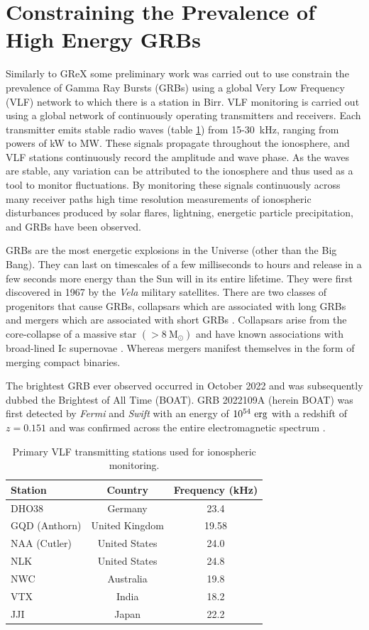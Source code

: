 \section{Constraining the Prevalence of High Energy GRBs}

Similarly to GReX some preliminary work was carried out to use constrain the prevalence of Gamma Ray Bursts (GRBs) using a global Very Low Frequency (VLF) network to which there is a station in Birr. VLF monitoring is carried out using a global network of continuously operating transmitters and receivers. Each transmitter emits stable radio waves  (table \ref{tab:VLFstations}) from 15-30~kHz, ranging from powers of kW to MW. These signals propagate throughout the ionosphere, and VLF stations continuously record the amplitude and wave phase. As the waves are stable, any variation can be attributed to the ionosphere and thus used as a tool to monitor fluctuations. By monitoring these signals continuously across many receiver paths high time resolution measurements of ionospheric disturbances produced by solar flares, lightning, energetic particle precipitation, and GRBs have been observed. 

GRBs are the most energetic explosions in the Universe (other than the Big Bang). They can last on timescales of a few milliseconds to hours and release in a few seconds more energy than the Sun will in its entire lifetime. They were first discovered in 1967 \citep{1973_Klebs} by the \textit{Vela} military satellites.  There are two classes of progenitors that cause GRBs, collapsars which are associated with long GRBs and mergers which are associated with short GRBs \citep{1993_kouvel}.  Collapsars arise from the core-collapse of a massive star $(>8~\text{M}_\odot)$ and have known associations with broad-lined Ic supernovae \citep{1998_galama, cotter_machine_2025}. Whereas mergers manifest themselves in the form of merging compact binaries.

The brightest GRB ever observed occurred in October 2022 and was subsequently dubbed the Brightest of All Time (BOAT). GRB 2022109A (herein BOAT) was first detected by \textit{Fermi} and \textit{Swift} with an energy of $10^{54}~\rm erg$ with a redshift of $z=0.151$ and was confirmed across the entire electromagnetic spectrum \citep{Williams_2023, 2023_shrin}.

\begin{table}[htbp]
\centering
\begin{tabular}{lcc}
\hline
\textbf{Station} & \textbf{Country} & \textbf{Frequency (kHz)} \\
\hline
DHO38 & Germany & 23.4 \\
GQD (Anthorn) & United Kingdom & 19.58 \\
NAA (Cutler) & United States & 24.0 \\
NLK & United States & 24.8 \\
NWC & Australia & 19.8 \\
VTX & India & 18.2 \\
JJI & Japan & 22.2 \\
\hline
\end{tabular}
\caption{Primary VLF transmitting stations used for ionospheric monitoring.}
\label{tab:VLFstations}
\end{table}

